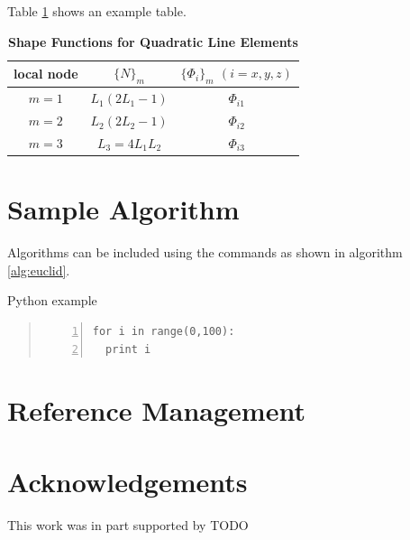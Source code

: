 \documentclass[9pt,twocolumn,twoside]{styles/osajnl}
\begin{document}
Table \ref{tab:shape-functions} shows an example table.

\begin{table}[htbp]
\centering
\caption{\bf Shape Functions for Quadratic Line Elements}
\begin{tabular}{ccc}
\hline
local node & $\{N\}_m$ & $\{\Phi_i\}_m$ $(i=x,y,z)$ \\
\hline
$m = 1$ & $L_1(2L_1-1)$ & $\Phi_{i1}$ \\
$m = 2$ & $L_2(2L_2-1)$ & $\Phi_{i2}$ \\
$m = 3$ & $L_3=4L_1L_2$ & $\Phi_{i3}$ \\
\hline
\end{tabular}
  \label{tab:shape-functions}
\end{table}


\section{Sample Algorithm}

Algorithms can be included using the commands as shown in algorithm
\ref{alg:euclid}.


\begin{algorithm}
\caption{Python example}\label{alg:python}
\begin{quote}
\begin{Verbatim}[numbers=left]
for i in range(0,100):
  print i
\end{Verbatim}
\end{quote}
\end{algorithm}

\section{Reference Management}

\cite{las14cloudmeshmultiple} 
\cite{www-i524}

\section*{Acknowledgements}

This work was in part supported by TODO




 
\end{document}
